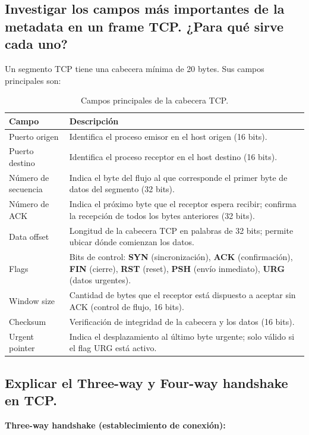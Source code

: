 \documentclass[12pt,a4paper]{article}
\begin{document}
\subsection{Investigar los campos más importantes de la metadata en un frame TCP. ¿Para qué sirve cada uno?}

Un segmento TCP tiene una cabecera mínima de 20 bytes. Sus campos principales son:

\begin{table}[H]
\centering
\begin{tabular}{@{}lp{9cm}@{}}
\toprule
\textbf{Campo} & \textbf{Descripción} \\
\midrule
Puerto origen & Identifica el proceso emisor en el host origen (16 bits). \\
Puerto destino & Identifica el proceso receptor en el host destino (16 bits). \\
Número de secuencia & Indica el byte del flujo al que corresponde el primer byte de datos del segmento (32 bits). \\
Número de ACK & Indica el próximo byte que el receptor espera recibir; confirma la recepción de todos los bytes anteriores (32 bits). \\
Data offset & Longitud de la cabecera TCP en palabras de 32 bits; permite ubicar dónde comienzan los datos. \\
Flags & Bits de control: \textbf{SYN} (sincronización), \textbf{ACK} (confirmación), \textbf{FIN} (cierre), \textbf{RST} (reset), \textbf{PSH} (envío inmediato), \textbf{URG} (datos urgentes). \\
Window size & Cantidad de bytes que el receptor está dispuesto a aceptar sin ACK (control de flujo, 16 bits). \\
Checksum & Verificación de integridad de la cabecera y los datos (16 bits). \\
Urgent pointer & Indica el desplazamiento al último byte urgente; solo válido si el flag URG está activo. \\
\bottomrule
\end{tabular}
\caption{Campos principales de la cabecera TCP.}
\end{table}

\subsection{Explicar el Three-way y Four-way handshake en TCP.}

\textbf{Three-way handshake (establecimiento de conexión):}
\end{document}
